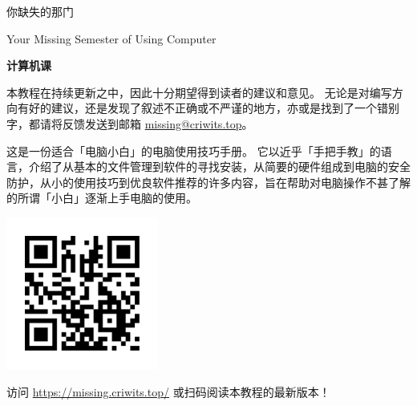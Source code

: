 \documentclass[a4paper]{book}
\date{\today}
\begin{document}
\maketitle

\frontmatter
{}
\thispagestyle{empty}
\begin{center}
  \vspace*{2.5cm}
  \fontsize{42pt}{54pt}\selectfont{}\textsf{你缺失的那门}\par
  \fontsize{18pt}{18pt}\selectfont{}\textsf{Your Missing Semester of Using Computer}\par
  \fontsize{54pt}{8pt}\selectfont{}\textbf{\textsf{计算机课}}\par
  \vspace*{3.6cm}
\end{center}

\begin{note}
  本教程在持续更新之中，因此十分期望得到读者的建议和意见。
  无论是对编写方向有好的建议，还是发现了叙述不正确或不严谨的地方，亦或是找到了一个错别字，都请将反馈发送到邮箱 \href{mailto:missing@criwits.top}{missing@criwits.top}。
\end{note}

这是一份适合「电脑小白」的电脑使用技巧手册。
它以近乎「手把手教」的语言，介绍了从基本的文件管理到软件的寻找安装，从简要的硬件组成到电脑的安全防护，从小的使用技巧到优良软件推荐的许多内容，旨在帮助对电脑操作不甚了解的所谓「小白」逐渐上手电脑的使用。

\begin{center}
  \vspace*{1cm}
  \includegraphics[width=5cm]{assets/QR_CODE.png}\par
  访问 \url{https://missing.criwits.top/} 或扫码阅读本教程的最新版本！\par
\end{center}  

\tableofcontents


\end{document}
